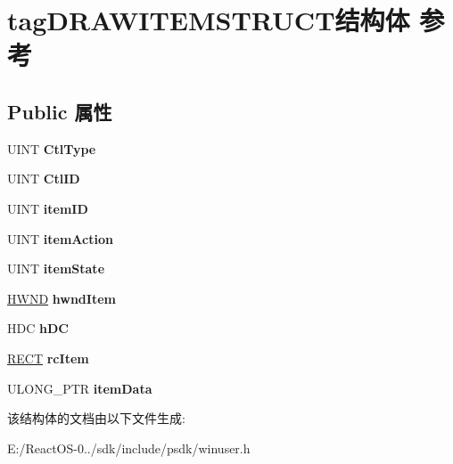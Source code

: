 \hypertarget{structtag_d_r_a_w_i_t_e_m_s_t_r_u_c_t}{}\section{tag\+D\+R\+A\+W\+I\+T\+E\+M\+S\+T\+R\+U\+C\+T结构体 参考}
\label{structtag_d_r_a_w_i_t_e_m_s_t_r_u_c_t}
\subsection*{Public 属性}
\begin{DoxyCompactItemize}
\item 
\mbox{\label{structtag_d_r_a_w_i_t_e_m_s_t_r_u_c_t_a71d4ad942914efc8e563439cd2ca83fe}} 
U\+I\+NT {\bfseries Ctl\+Type}
\item 
\mbox{\label{structtag_d_r_a_w_i_t_e_m_s_t_r_u_c_t_a1f68d013a64421810b005624e6232251}} 
U\+I\+NT {\bfseries Ctl\+ID}
\item 
\mbox{\label{structtag_d_r_a_w_i_t_e_m_s_t_r_u_c_t_a20034a14f718dec2301fd2534806affb}} 
U\+I\+NT {\bfseries item\+ID}
\item 
\mbox{\label{structtag_d_r_a_w_i_t_e_m_s_t_r_u_c_t_ac630e853f2ea92458a8b8b2a79a42a43}} 
U\+I\+NT {\bfseries item\+Action}
\item 
\mbox{\label{structtag_d_r_a_w_i_t_e_m_s_t_r_u_c_t_a18286cfd68b2b6d48b3201bd5878cfa7}} 
U\+I\+NT {\bfseries item\+State}
\item 
\mbox{\label{structtag_d_r_a_w_i_t_e_m_s_t_r_u_c_t_ab397e75dc3b2a57880ad4809fe6d6814}} 
\hyperlink{interfacevoid}{H\+W\+ND} {\bfseries hwnd\+Item}
\item 
\mbox{\label{structtag_d_r_a_w_i_t_e_m_s_t_r_u_c_t_ac9e3f6afe01e74ef674dde2409eab946}} 
H\+DC {\bfseries h\+DC}
\item 
\mbox{\label{structtag_d_r_a_w_i_t_e_m_s_t_r_u_c_t_ac7a7c4bf0c7465541c7645613d62ce20}} 
\hyperlink{structtag_r_e_c_t}{R\+E\+CT} {\bfseries rc\+Item}
\item 
\mbox{\label{structtag_d_r_a_w_i_t_e_m_s_t_r_u_c_t_a52a57aff3f95738a8de8079e1a9b2f97}} 
U\+L\+O\+N\+G\+\_\+\+P\+TR {\bfseries item\+Data}
\end{DoxyCompactItemize}


该结构体的文档由以下文件生成\+:\begin{DoxyCompactItemize}
\item 
E\+:/\+React\+O\+S-\/0../sdk/include/psdk/winuser.\+h\end{DoxyCompactItemize}
